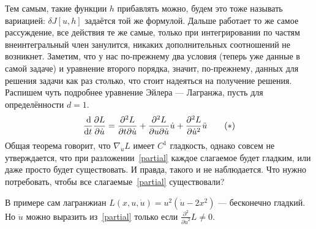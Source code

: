 \documentclass[a4paper]{article}
\begin{document}
    Тем самым, такие функции $h$ прибавлять можно, будем это тоже называть вариацией: $\delta J[u, h]$ задаётся той же формулой.
    Дальше работает то же самое рассуждение, все действия те же самые, только при интегрировании по частям внеинтегральный член занулится, никаких дополнительных соотношений не возникнет.
    Заметим, что у нас по-прежнему два условия (теперь уже данные в самой задаче) и уравнение второго порядка, значит, по-прежнему, данных для решения задачи как раз столько, что стоит надеяться на получение решения.
    Распишем чуть подробнее уравнение Эйлера --- Лагранжа, пусть для определённости $d = 1$.
    \[\frac{\operatorname{d}\!}{\operatorname{d}\! t}\frac{\partial L}{\partial \dot{u}} = \frac{\partial^2 L}{\partial t \partial \dot{u}} + \frac{\partial^2 L}{\partial u \partial \dot{u}}\dot{u} + \frac{\partial^2 L}{\partial \dot{u}^2}\ddot{u}\label{partial}\tag{$*$}\]
    Общая теорема говорит, что $\nabla_{\dot{u}}L$ имеет $C^1$ гладкость, однако совсем не утверждается, что при разложении~\eqref{partial} каждое слагаемое будет гладким, или даже просто будет существовать.
    И правда, такого и не наблюдается.
    Что нужно потребовать, чтобы все слагаемые~\eqref{partial} существовали?

    В примере сам лагранжиан $L(x, u, \dot{u}) = u^2(\dot{u} - 2x^2)$ --- бесконечно гладкий.
    Но $\ddot{u}$ можно выразить из~\eqref{partial} только если $\frac{\partial^2}{\partial \dot{u}^2}L \ne 0$.
\end{document}
